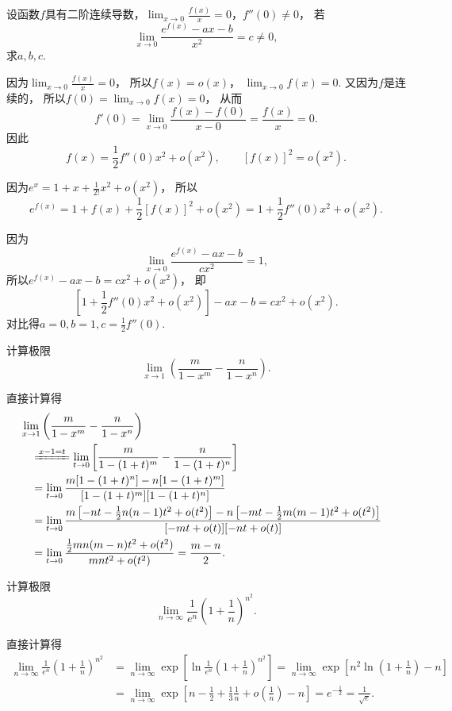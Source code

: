 \begin{example}
设函数\(f\)具有二阶连续导数，\(\lim_{x\to0} \frac{f(x)}{x} = 0\)，\(f''(0)\neq0\)，
若\[
	\lim_{x\to0} \frac{e^{f(x)}-ax-b}{x^2} = c \neq 0,
\]
求\(a,b,c\).
\begin{solution}
因为\(\lim_{x\to0} \frac{f(x)}{x} = 0\)，
所以\(f(x) = o(x)\)，
\(\lim_{x\to0} f(x) = 0\).
又因为\(f\)是连续的，
所以\(f(0) = \lim_{x\to0} f(x) = 0\)，
从而\[
	f'(0) = \lim_{x\to0} \frac{f(x) - f(0)}{x - 0} = \frac{f(x)}{x} = 0.
\]
因此\[
	f(x) = \frac12 f''(0) x^2 + o(x^2),
	\qquad
	[f(x)]^2 = o(x^2).
\]

因为\(e^x = 1 + x + \frac{1}{2!} x^2 + o(x^2)\)，
所以\[
	e^{f(x)} = 1 + f(x) + \frac{1}{2} [f(x)]^2 + o(x^2)
	= 1 + \frac{1}{2} f''(0) x^2 + o(x^2).
\]

因为\[
	\lim_{x\to0} \frac{e^{f(x)} - ax - b}{c x^2} = 1,
\]
所以\(e^{f(x)} - ax - b = c x^2 + o(x^2)\)，
即\[
	\left[ 1 + \frac{1}{2} f''(0) x^2 + o(x^2) \right] - ax - b = c x^2 + o(x^2).
\]
对比得\(a = 0, b = 1, c = \frac{1}{2} f''(0)\).
\end{solution}
\end{example}

\begin{example}
计算极限\[
	\lim_{x\to1} \left(\frac{m}{1-x^m} - \frac{n}{1-x^n}\right).
\]
\begin{solution}
直接计算得
\begin{align*}
	&\hspace{-10pt}
	\lim_{x\to1} \left(\frac{m}{1-x^m} - \frac{n}{1-x^n}\right) \\
	&\xlongequal{x-1=t}
	\lim_{t\to0} \left[\frac{m}{1-(1+t)^m}-\frac{n}{1-(1+t)^n}\right] \\
	&=
	\lim_{t\to0} \frac{m[1-(1+t)^n]-n[1-(1+t)^m]}{[1-(1+t)^m][1-(1+t)^n]} \\
	&=
	\lim_{t\to0} \frac{m\left[-nt-\frac{1}{2}n(n-1)t^2+o(t^2)\right]
		-n\left[-mt-\frac{1}{2}m(m-1)t^2+o(t^2)\right]}{[-mt+o(t)][-nt+o(t)]} \\
	&=
	\lim_{t\to0} \frac{\frac{1}{2}mn(m-n)t^2+o(t^2)}{mnt^2+o(t^2)}
	= \frac{m-n}{2}.
\end{align*}
\end{solution}
\end{example}

\begin{example}
计算极限\[
	\lim_{n\to\infty} \frac{1}{e^n} \left(1+\frac{1}{n}\right)^{n^2}.
\]
\begin{solution}
直接计算得\begin{align*}
	\lim_{n\to\infty} \frac{1}{e^n} \left(1+\frac{1}{n}\right)^{n^2}
	&= \lim_{n\to\infty} \exp[\ln\frac{1}{e^n} \left(1+\frac{1}{n}\right)^{n^2}]
	= \lim_{n\to\infty} \exp[ n^2 \ln(1+\frac{1}{n}) - n ] \\
	&= \lim_{n\to\infty} \exp[ n - \frac{1}{2} + \frac{1}{3} \frac{1}{n} + o\left(\frac{1}{n}\right) - n ]
	= e^{-\frac{1}{2}}
	= \frac{1}{\sqrt{e}}.
\end{align*}
\end{solution}
\end{example}

